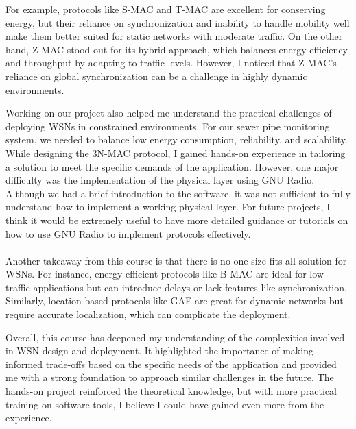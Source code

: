 For example, protocols like S-MAC and T-MAC are excellent for conserving energy, but their reliance on synchronization and inability to handle mobility well make them better suited for static networks with moderate traffic. On the other hand, Z-MAC stood out for its hybrid approach, which balances energy efficiency and throughput by adapting to traffic levels. However, I noticed that Z-MAC's reliance on global synchronization can be a challenge in highly dynamic environments.

Working on our project also helped me understand the practical challenges of deploying WSNs in constrained environments. For our sewer pipe monitoring system, we needed to balance low energy consumption, reliability, and scalability. While designing the 3N-MAC protocol, I gained hands-on experience in tailoring a solution to meet the specific demands of the application. However, one major difficulty was the implementation of the physical layer using GNU Radio.
Although we had a brief introduction to the software, it was not sufficient to fully understand how to implement a working physical layer. For future projects, I think it would be extremely useful to have more detailed guidance or tutorials on how to use GNU Radio to implement protocols effectively.
\\
\\
\indent Another takeaway from this course is that there is no one-size-fits-all solution for WSNs. For instance, energy-efficient protocols like B-MAC are ideal for low-traffic applications but can introduce delays or lack features like synchronization. Similarly, location-based protocols like GAF are great for dynamic networks but require accurate localization, which can complicate the deployment.

Overall, this course has deepened my understanding of the complexities involved in WSN design and deployment. It highlighted the importance of making informed trade-offs based on the specific needs of the application and provided me with a strong foundation to approach similar challenges in the future. The hands-on project reinforced the theoretical knowledge, but with more practical training on software tools, I believe I could have gained even more from the experience.